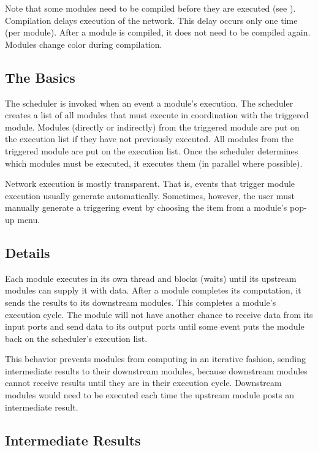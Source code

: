 Note that some modules need to be compiled before they are
executed (see ).  Compilation
delays execution of the network.  This delay occurs only one time
(per module).  After a module is compiled, it does not need to be
compiled again.  Modules change color during compilation.

\subsection{The Basics}

The scheduler is invoked when an event  a
module's execution.  The scheduler creates a list of all modules that
must execute in coordination with the triggered module. Modules
 (directly or indirectly) from the triggered module are 
put on the execution list if they have not previously executed.
All modules  from the triggered module are put
on the execution list.  Once the scheduler determines which modules must be
executed, it executes them (in parallel where possible).

Network execution is mostly transparent.  That is, events that trigger
module execution usually generate automatically. Sometimes,
however, the user must manually
generate a triggering event by choosing the  item from a
module's pop-up menu.

\subsection{Details}

Each module executes in its own thread and blocks (waits) until its
upstream modules can supply it with data.  After a module completes
its computation, it sends the results to its downstream modules.  This
completes a module's execution cycle.  The module will not have
another chance to receive data from its input ports and send data to
its output ports until some event puts the module back on the
scheduler's execution list.

This behavior prevents modules from computing in an iterative fashion,
sending intermediate results to their downstream modules, because
downstream modules cannot receive results until they are in their
execution cycle. Downstream modules would need to be executed each time the
upstream module posts an intermediate result.


\subsection{Intermediate Results}


